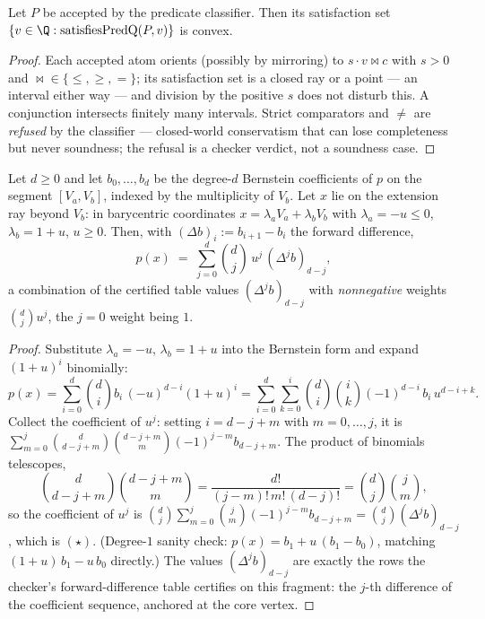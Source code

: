 \begin{blemma}\label{lem:bc-convex}
Let $P$ be accepted by the predicate classifier. Then its satisfaction
set $\{ v \in \Q : \mathrm{satisfiesPredQ}(P, v) \}$ is convex.
\end{blemma}
\begin{proof}
Each accepted atom orients (possibly by mirroring) to
$s \cdot v \bowtie c$ with $s > 0$ and
$\bowtie \in \{\leq, \geq, =\}$; its satisfaction set is a closed ray or
a point --- an interval either way --- and division by the positive $s$
does not disturb this. A conjunction intersects finitely many intervals.
Strict comparators and $\neq$ are \emph{refused} by the classifier ---
closed-world conservatism that can lose completeness but never
soundness; the refusal is a checker verdict, not a soundness case.
\end{proof}

\begin{blemma}\label{lem:bc-star}
Let $d \geq 0$ and let $b_0, \dots, b_d$ be the degree-$d$ Bernstein
coefficients of $p$ on the segment $[V_a, V_b]$, indexed by the
multiplicity of $V_b$. Let $x$ lie on the extension ray beyond $V_b$:
in barycentric coordinates $x = \lambda_a V_a + \lambda_b V_b$ with
$\lambda_a = -u \leq 0$, $\lambda_b = 1 + u$, $u \geq 0$. Then, with
$(\Delta b)_i := b_{i+1} - b_i$ the forward difference,
\[
p(x) \;=\; \sum_{j=0}^{d} \binom{d}{j}\, u^{j}\, (\Delta^{j} b)_{d-j},
\tag{$\star$}
\]
a combination of the certified table values $(\Delta^{j} b)_{d-j}$ with
\emph{nonnegative} weights $\binom{d}{j} u^{j}$, the $j = 0$ weight
being $1$.
\end{blemma}
\begin{proof}
Substitute $\lambda_a = -u$, $\lambda_b = 1 + u$ into the Bernstein
form and expand $(1+u)^i$ binomially:
\[
p(x) = \sum_{i=0}^{d} \binom{d}{i} b_i\, (-u)^{d-i} (1+u)^{i}
     = \sum_{i=0}^{d} \sum_{k=0}^{i} \binom{d}{i} \binom{i}{k}
       (-1)^{d-i}\, b_i\, u^{d-i+k}.
\]
Collect the coefficient of $u^{j}$: setting $i = d - j + m$ with
$m = 0, \dots, j$, it is
$\sum_{m=0}^{j} \binom{d}{d-j+m} \binom{d-j+m}{m} (-1)^{j-m}
b_{d-j+m}$. The product of binomials telescopes,
\[
\binom{d}{d-j+m} \binom{d-j+m}{m}
  = \frac{d!}{(j-m)!\, m!\, (d-j)!}
  = \binom{d}{j} \binom{j}{m},
\]
so the coefficient of $u^{j}$ is
$\binom{d}{j} \sum_{m=0}^{j} \binom{j}{m} (-1)^{j-m} b_{d-j+m}
 = \binom{d}{j} (\Delta^{j} b)_{d-j}$, which is $(\star)$. (Degree-$1$
sanity check: $p(x) = b_1 + u\,(b_1 - b_0)$, matching
$(1+u)\,b_1 - u\,b_0$ directly.) The values $(\Delta^{j} b)_{d-j}$ are
exactly the rows the checker's forward-difference table certifies on
this fragment: the $j$-th difference of the coefficient sequence,
anchored at the core vertex.
\end{proof}

